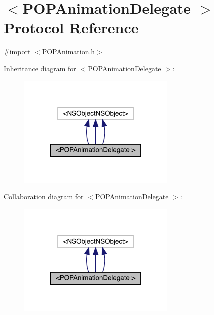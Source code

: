 \hypertarget{protocol_p_o_p_animation_delegate_01-p}{}\section{$<$P\+O\+P\+Animation\+Delegate $>$ Protocol Reference}
\label{protocol_p_o_p_animation_delegate_01-p}


{\ttfamily \#import $<$P\+O\+P\+Animation.\+h$>$}



Inheritance diagram for $<$P\+O\+P\+Animation\+Delegate $>$\+:\nopagebreak
\begin{figure}[H]
\begin{center}
\leavevmode
\includegraphics[width=215pt]{protocol_p_o_p_animation_delegate_01-p__inherit__graph}
\end{center}
\end{figure}


Collaboration diagram for $<$P\+O\+P\+Animation\+Delegate $>$\+:\nopagebreak
\begin{figure}[H]
\begin{center}
\leavevmode
\includegraphics[width=215pt]{protocol_p_o_p_animation_delegate_01-p__coll__graph}
\end{center}
\end{figure}
